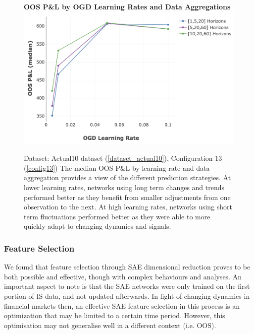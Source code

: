 \documentclass[a4paper,11pt,oneside]{article}
\theoremstyle{plain}
\theoremstyle{definition}
\begin{document}
	\begin{figure}[H]
		\textbf{OOS P\&L by OGD Learning Rates and Data Aggregations}
		\centering
		\includegraphics[scale=0.4]{images/results/8_2_determinants/OOS_OGDLR_Delta_PL_median.png}
		\caption[OOS P\&L by OGD Learning Rates and Data Aggregations]
		{Dataset: Actual10 dataset (\ref{dataset_actual10}), Configuration 13 (\ref{config13})
			\newline The median OOS P\&L by learning rate and data aggregation provides a view of the different prediction strategies. At lower learning rates, networks using long term changes and trends performed better as they benefit from smaller adjustments from one observation to the next. At high learning rates, networks using short term fluctuations performed better as they were able to more quickly adapt to changing dynamics and signals.}
		\label{figure-actual_ogd_lr_data}
	\end{figure}
	
	\subsubsection{Feature Selection}
	
	We found that feature selection through SAE dimensional reduction proves to be both possible and effective, though with complex behaviours and analyses. An important aspect to note is that the SAE networks were only trained on the first portion of IS data, and not updated afterwards. In light of changing dynamics in financial markets then, an effective SAE feature selection in this process is an optimization that may be limited to a certain time period. However, this optimisation may not generalise well in a different context (i.e. OOS). \newline
	
\end{document}
